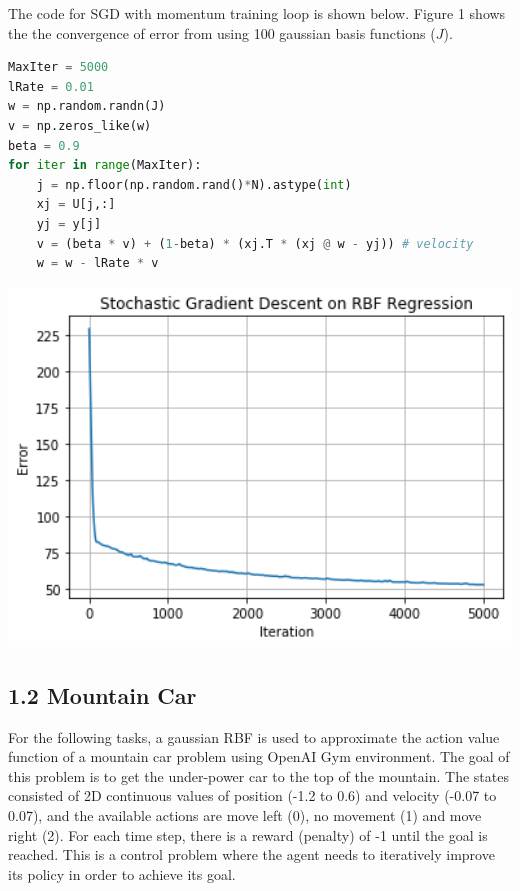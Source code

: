 \documentclass[12pt,letterpaper]{article}
\begin{document}
The code for SGD with momentum training loop is shown below.
Figure 1 shows the the convergence of error from using 100 gaussian basis functions ($J$).

\vspace{1.5em}

\begin{minipage}{0.5\textwidth}
 
\begin{lstlisting}[language=Python]
MaxIter = 5000
lRate = 0.01
w = np.random.randn(J)
v = np.zeros_like(w)
beta = 0.9
for iter in range(MaxIter):
    j = np.floor(np.random.rand()*N).astype(int)
    xj = U[j,:]
    yj = y[j]
    v = (beta * v) + (1-beta) * (xj.T * (xj @ w - yj)) # velocity
    w = w - lRate * v
\end{lstlisting}
\end{minipage}
\hfill
\begin{minipage}{0.45\textwidth}
\centering

\includegraphics[width=1.0\textwidth]{rbf_sgd.png}
\end{minipage}

\subsection*{1.2 Mountain Car}

For the following tasks, a gaussian RBF is used to approximate the action value function of a mountain car problem using OpenAI Gym environment.
The goal of this problem is to get the under-power car to the top of the mountain.
The states consisted of 2D continuous values of position (-1.2 to 0.6) and velocity (-0.07 to 0.07), 
and the available actions are move left (0), no movement (1) and move right (2). 
For each time step, there is a reward (penalty) of -1 until the goal is reached.
This is a control problem where the agent needs to iteratively improve its policy in order to achieve its goal.
\vspace{-1em}
\end{document}
